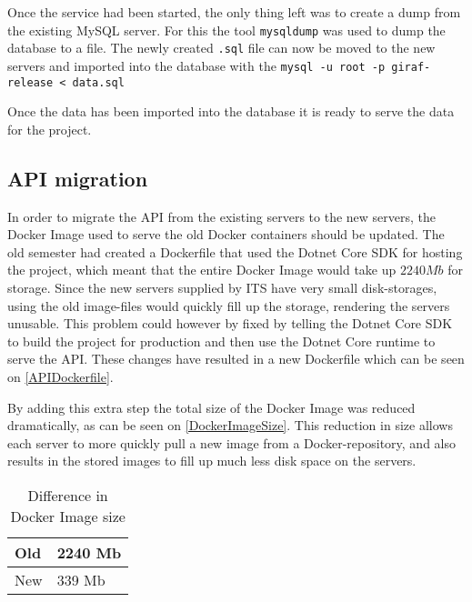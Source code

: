Once the service had been started, the only thing left was to create a dump from the existing MySQL server.
For this the tool \lstinline$mysqldump$ was used to dump the database to a file.
The newly created \lstinline$.sql$ file can now be moved to the new servers and imported into the database with the \lstinline$mysql -u root -p giraf-release < data.sql$

Once the data has been imported into the database it is ready to serve the data for the project.

\subsection{API migration}
In order to migrate the API from the existing servers to the new servers, the Docker Image used to serve the old Docker containers should be updated.
The old semester had created a Dockerfile that used the Dotnet Core SDK for hosting the project, which meant that the entire Docker Image would take up $2240 Mb$ for storage.
Since the new servers supplied by ITS have very small disk-storages, using the old image-files would quickly fill up the storage, rendering the servers unusable.
This problem could however by fixed by telling the Dotnet Core SDK to build the project for production and then use the Dotnet Core runtime to serve the API.
These changes have resulted in a new Dockerfile which can be seen on \autoref{APIDockerfile}.

By adding this extra step the total size of the Docker Image was reduced dramatically, as can be seen on \autoref{DockerImageSize}.
This reduction in size allows each server to more quickly pull a new image from a Docker-repository, and also results in the stored images to fill up much less disk space on the servers.

\begin{table}[H]
\centering
\begin{tabular}{|l|l|}
\hline
Old & 2240 Mb \\ \hline
New &  339 Mb  \\ \hline
\end{tabular}
\caption{Difference in Docker Image size}
\label{DockerImageSize}
\end{table}


